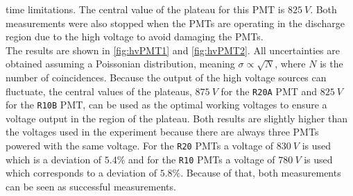 time limitations.
The central value of the plateau for this PMT is $\SI{825}{V}$.
Both measurements were also stopped when the PMTs are operating in the discharge region due to the high voltage to 
avoid damaging the PMTs.\\
The results are shown in \autoref{fig:hvPMT1} and \autoref{fig:hvPMT2}. All uncertainties are obtained 
assuming a Poissonian distribution, meaning $\sigma \propto \sqrt{N}$, where $N$ is the number of
coincidences. Because the output of the high voltage sources can fluctuate, the central values of the plateaus, $\SI{875}{V}$ for the \texttt{R20A} PMT and 
$\SI{825}{V}$ for the \texttt{R10B} PMT, can be used as the optimal working voltages to ensure
a voltage output in the region of the plateau. Both results are slightly higher than the voltages used
in the experiment because there are always three PMTs powered with the same 
voltage. For the \texttt{R20} PMTs a voltage of $\SI{830}{V}$ is used which is a deviation of $5.4\%$
and for the \texttt{R10} PMTs a voltage of $\SI{780}{V}$ is used which corresponds to a deviation of 
$5.8\%$. Because of that, both measurements can be seen as successful measurements.

